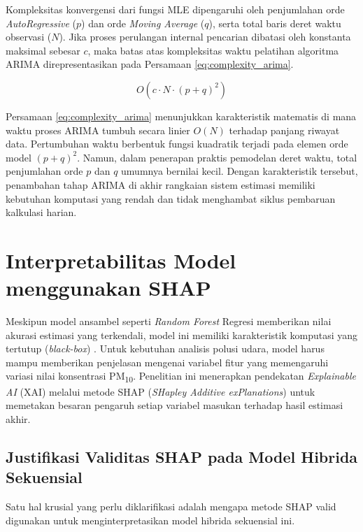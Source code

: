 Kompleksitas konvergensi dari fungsi MLE dipengaruhi oleh penjumlahan orde \textit{AutoRegressive} ($p$) dan orde \textit{Moving Average} ($q$), serta total baris deret waktu observasi ($N$). Jika proses perulangan internal pencarian dibatasi oleh konstanta maksimal sebesar $c$, maka batas atas kompleksitas waktu pelatihan algoritma ARIMA direpresentasikan pada Persamaan \ref{eq:complexity_arima}.

\begin{equation}
   O(c \cdot N \cdot (p+q)^2)
\label{eq:complexity_arima}
\end{equation}

Persamaan \ref{eq:complexity_arima} menunjukkan karakteristik matematis di mana waktu proses ARIMA tumbuh secara linier $O(N)$ terhadap panjang riwayat data. Pertumbuhan waktu berbentuk fungsi kuadratik terjadi pada elemen orde model $(p+q)^2$. Namun, dalam penerapan praktis pemodelan deret waktu, total penjumlahan orde $p$ dan $q$ umumnya bernilai kecil. Dengan karakteristik tersebut, penambahan tahap ARIMA di akhir rangkaian sistem estimasi memiliki kebutuhan komputasi yang rendah dan tidak menghambat siklus pembaruan kalkulasi harian.

\section{Interpretabilitas Model menggunakan SHAP}

Meskipun model ansambel seperti \textit{Random Forest} Regresi memberikan nilai akurasi estimasi yang terkendali, model ini memiliki karakteristik komputasi yang tertutup (\textit{black-box}) \autocite{jimenez2024explainable}. Untuk kebutuhan analisis polusi udara, model harus mampu memberikan penjelasan mengenai variabel fitur yang memengaruhi variasi nilai konsentrasi PM\textsubscript{10}. Penelitian ini menerapkan pendekatan \textit{Explainable AI} (XAI) melalui metode SHAP (\textit{SHapley Additive exPlanations}) untuk memetakan besaran pengaruh setiap variabel masukan terhadap hasil estimasi akhir.

\subsection{Justifikasi Validitas SHAP pada Model Hibrida Sekuensial}
Satu hal krusial yang perlu diklarifikasi adalah mengapa metode SHAP valid digunakan untuk menginterpretasikan model hibrida sekuensial ini.

